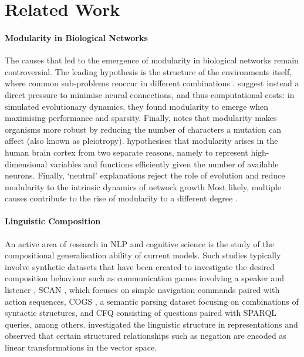 \documentclass[10pt]{article} %
\begin{document}
\section{Related Work}
\paragraph{Modularity in Biological Networks} The causes that led to the emergence of modularity in biological networks remain controversial. The leading hypothesis is the structure of the environments itself, where common sub-problems reoccur in different combinations \citep{kashtan2005spontaneous}. \citet{clune2013evolutionary} suggest instead a direct pressure to minimise neural connections, and thus computational costs: in simulated evolutionary dynamics, they found modularity to emerge when maximising performance and sparsity. Finally, \citet{schlosser2004modularity} notes that modularity makes organisms more robust by reducing the number of characters a mutation can affect (also known as pleiotropy). \citet{ballard1986cortical} hypothesises that modularity arises in the human brain cortex from two separate reasons, namely to represent high-dimensional variables and functions efficiently given the number of available neurons.
Finally, `neutral' explanations reject the role of evolution and reduce modularity to the intrinsic dynamics of network growth \citep{sole2008spontaneous}
Most likely, multiple causes contribute to the rise of modularity to a different degree \citep{wagner2007road}.

 

\paragraph{Linguistic Composition} An active area of research in NLP and cognitive science is the study of the compositional generalisation ability of current models. Such studies typically involve synthetic datasets that have been created to investigate the desired composition behaviour such as communication games involving a speaker and listener \citep{Andreas2019}, SCAN \citep{lake2018generalization}, which focuses on simple navigation commands paired with action sequences, COGS \citep{Kim2020COGS}, a semantic parsing dataset focusing on combinations of syntactic structures, and CFQ \citep{Keysers2020MeasuringComposition} consisting of questions paired with SPARQL queries, among others. \citet{Andreas2017} investigated the linguistic structure in representations and observed that certain structured relationships such as negation are encoded as linear transformations in the vector space.
\end{document}
